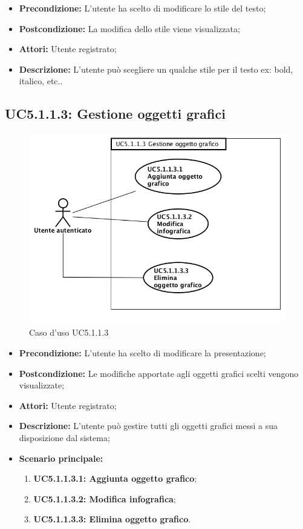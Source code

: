 \begin{itemize}
	\item \textbf{Precondizione:} L'utente ha scelto di modificare lo stile del testo;
	\item \textbf{Postcondizione:} La modifica dello stile viene visualizzata;
	\item \textbf{Attori:} Utente registrato;
	\item \textbf{Descrizione:} L'utente può scegliere un qualche stile per il testo ex: bold, italico, etc..
\end{itemize}
\subsection{ UC5.1.1.3: Gestione oggetti grafici}

\begin{figure}[h]
	\begin{center}
	\includegraphics[scale=0.4]{diagram/UC5-1-1-3.png}
	\caption{Caso d'uso UC5.1.1.3}
	\end{center}
\end{figure}
\begin{itemize}
	\item \textbf{Precondizione:} L'utente ha scelto di modificare la presentazione;
	\item \textbf{Postcondizione:} Le modifiche apportate agli oggetti grafici scelti vengono visualizzate;
	\item \textbf{Attori:} Utente registrato;
	\item \textbf{Descrizione:} L'utente può gestire tutti gli oggetti grafici messi a sua disposizione dal sistema;
	\item \textbf{Scenario principale:}
	\begin{enumerate}
		\item \textbf{ UC5.1.1.3.1: Aggiunta oggetto grafico};
		\item \textbf{ UC5.1.1.3.2: Modifica infografica};
		\item \textbf{ UC5.1.1.3.3: Elimina oggetto grafico}.
	\end{enumerate}
\end{itemize}
